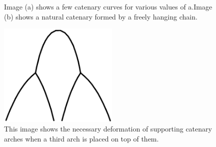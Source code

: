\documentclass{thesis}
\begin{document}
\begin{figure}
\centering
{}
\caption[Example catenary curves]{Image (a) shows a few catenary curves for various values of a.\footnotemark  Image
(b) shows a natural catenary formed by a freely hanging chain.\footnotemark}
\end{figure}

\begin{figure}
\centering
\includegraphics[width=2.25in]{images/compound_catenary.png}
\caption[A composite catenary structure]{This image shows the necessary deformation of supporting catenary arches when a third arch is placed
on top of them.}
\label{fig:compound_catenary}
\end{figure}
\end{document}
